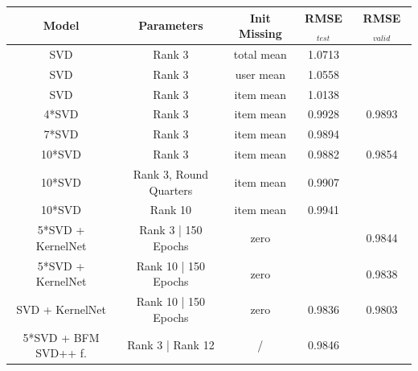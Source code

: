 \documentclass[10pt,conference,compsocconf]{IEEEtran}
\begin{document}
    \begin{table}[h]
        \centering
        \begin{tabular}{|| c | c | c | c | c ||}
            \hline
            \textbf{Model}       & \textbf{Parameters}                       & \textbf{ Init Missing } & \textbf{RMSE}$_{test}$ & \textbf{RMSE}$_{valid}$ \\
            \hline
            SVD                  & Rank 3                                & total mean              & 1.0713                 &                         \\
            SVD                  & Rank 3                                & user mean               & 1.0558                 &                         \\
            SVD                  & Rank 3                                & item mean               & 1.0138                 &                         \\
            4*SVD                & Rank 3                                & item mean               & 0.9928                 & 0.9893                  \\
            7*SVD                & Rank 3                                & item mean               & 0.9894                 &                         \\
            10*SVD               & Rank 3                                & item mean               & 0.9882                 & 0.9854                  \\
            10*SVD               & Rank 3, Round Quarters                & item mean               & 0.9907                 &                         \\
            10*SVD               & Rank 10                               & item mean               & 0.9941                 &                         \\
            5*SVD + KernelNet    & Rank 3 | 150 Epochs                   & zero                    &                        & 0.9844                  \\
            5*SVD + KernelNet    & Rank 10 | 150 Epochs                  & zero                    &                        & 0.9838                  \\
            SVD + KernelNet      & Rank 10 | 150 Epochs                  & zero                    & 0.9836                 & 0.9803                  \\
            5*SVD + BFM SVD++ f. & Rank 3 | Rank 12                      & /                       & 0.9846                 &                         \\

\end{tabular}
\end{table}
\end{document}
